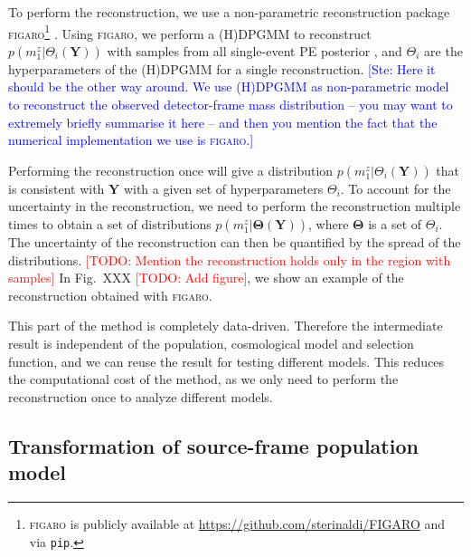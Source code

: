 \documentclass[aps,prd,twocolumn,superscriptaddress,preprintnumbers,nofootinbib,hidelinks]{revtex4-2}
\newcommand{\todo}[1]{\textcolor{red}{[TODO: #1]}}
\newcommand{\ste}[1]{\textcolor{blue}{[Ste: #1]}}
\begin{document}
To perform the reconstruction, we use a non-parametric reconstruction package \textsc{figaro}\footnote{\textsc{figaro} is publicly available at \url{https://github.com/sterinaldi/FIGARO} and via \texttt{pip}.} \citep{Rinaldi:2022kyg}.
Using \textsc{figaro}, we perform a \ac{(H)DPGMM} to reconstruct $p(m^z_1|\Theta_i(\mathbf{Y}))$ with samples from all single-event \ac{PE} posterior \citep{Rinaldi:2021bhm}, and $\Theta_i$ are the hyperparameters of the \ac{(H)DPGMM} for a single reconstruction.
\ste{Here it should be the other way around. We use (H)DPGMM as non-parametric model to reconstruct the observed detector-frame mass distribution -- you may want to extremely briefly summarise it here -- and then you mention the fact that the numerical implementation we use is \textsc{figaro}.}

Performing the reconstruction once will give a distribution $p(m^z_1|\Theta_i(\mathbf{Y}))$ that is consistent with $\mathbf{Y}$ with a given set of hyperparameters $\Theta_i$.
To account for the uncertainty in the reconstruction, we need to perform the reconstruction multiple times to obtain a set of distributions $p(m^z_1|\mathbf{\Theta}(\mathbf{Y}))$, where $\mathbf{\Theta}$ is a set of $\Theta_i$.
The uncertainty of the reconstruction can then be quantified by the spread of the distributions.
\todo{Mention the reconstruction holds only in the region with samples}
In Fig.~XXX \todo{Add figure}, we show an example of the reconstruction obtained with \textsc{figaro}.

This part of the method is completely data-driven.
Therefore the intermediate result is independent of the population, cosmological model and selection function, and we can reuse the result for testing different models.
This reduces the computational cost of the method, as we only need to perform the reconstruction once to analyze different models.

\subsection{Transformation of source-frame population model}
\label{sec:transformation}
\end{document}
